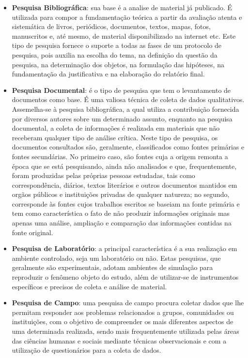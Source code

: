 \begin{itemize}
\item \textbf{Pesquisa Bibliográfica}: sua base é a analise de material já publicado. É utilizada para compor a fundamentação teórica a partir da avaliação atenta e sistemática de livros, periódicos, documentos, textos, mapas, fotos, manus\-critos e, até mesmo, de material disponibilizado na internet etc. Este tipo de pesquisa fornece o suporte a todas as fases de um protocolo de pesquisa, pois auxilia na escolha do tema, na definição da questão da pesquisa, na determinação dos objetos, na formulação das hipóteses, na fundamentação da justificativa e na elaboração do relatório final.
\item \textbf{Pesquisa Documental}: é o tipo de pesquisa que tem o levantamento de documentos como base. É uma valiosa técnica de coleta de dados qualitativos. Assemelha-se à pesquisa bibliográfica, a qual utiliza a contribuição fornecida por diversos autores sobre um determinado assunto, enquanto na pesquisa documental, a coleta de informações é realizada em materiais que não receberam qualquer tipo de análise crítica. Neste tipo de pesquisa, os documentos consultados são, geralmente, classificados  como fontes pri\-márias e fontes secundárias. No primeiro caso, são fontes cuja a origem remonta a época que se está pesquisando, ainda não analisados e que, frequentemente, foram produzidas pelas próprias pessoas estudadas, tais como correspondência, diários, textos literários e outros documentos mantidos em orgãos públicos e instituições privadas de qualquer natureza; no segundo, corresponde às fontes cujos trabalhos escritos se baseiam na fonte primária e tem como característica o fato de não produzir informações originais mas apenas uma análise, ampliação e comparação das informações contidas na fonte original.
\item \textbf{Pesquisa de Laboratório}: a principal característica é a sua realização em ambiente controlado, seja um laboratório ou não. Estas pesquisas, que geralmente são experimentais, adotam ambientes de simulação para reproduzir o fenômeno objeto do estudo, além de utilizar-se de instrumentos específicos e precisos de coleta e análise de material.
\item \textbf{Pesquisa de Campo}: uma pesquisa de campo procura coletar dados que lhe permitam responder aos problemas relacionados a grupos, comunidades ou instituições, com o objetivo de compreender os mais diferentes aspectos de uma determinada realizada, sendo mais frequentemente utilizada pelas áreas das ciências humanas e sociais mediante técnicas observacionais e com a utilização de questionários para a coleta de dados. 
\end{itemize}

